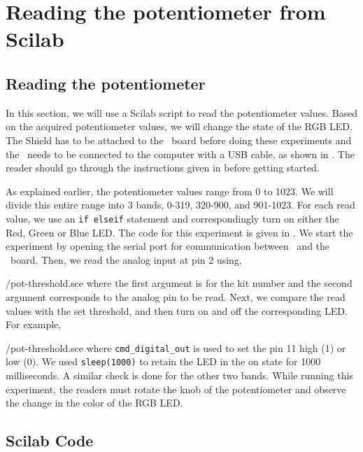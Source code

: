 \section{Reading the potentiometer from Scilab}
\subsection{Reading the potentiometer}
In this section, we will use a Scilab script to read the potentiometer
values.  Based on the acquired potentiometer values, we will change
the state of the RGB LED. The Shield has to be attached to the \arduino\ board
before doing these experiments and the \arduino\ needs to be connected to the computer 
with a USB cable, as shown in .
The reader should go through the instructions given in
 before getting started. 

As explained earlier, the potentiometer values range from 0 to 1023. We will divide this entire range into 3
bands, 0-319, 320-900, and 901-1023. For each read value, we use an
{\tt if elseif} statement and correspondingly turn on either the Red,
Green or Blue LED. The code for this experiment is given in
. We start the experiment by opening the serial
port for communication between \scilab\ and the \arduino\ board. Then,
we read the analog input at pin 2 using,

                {\LocPotscicode/pot-threshold.sce} where the first
                argument is for
the kit number and the second argument corresponds to the analog pin to be read.  Next, we compare the read values with the set threshold, 
and then turn on and off the corresponding LED. For example, 

{\LocPotscicode/pot-threshold.sce} where {\tt cmd\_digital\_out} 
is used to set the pin 11 high (1) or low (0). 
We used {\tt sleep(1000)} to retain the LED in the on state for 
1000 milliseconds.  
A similar check is done for the other two bands. 
While running this experiment, 
the readers must rotate the knob of the potentiometer and observe 
the change in the color of the RGB LED. 

\subsection{Scilab Code}
\label{sec:pot-scilab-code}
\begin{scicode}
\label{sci:pot-100}

\end{scicode}

